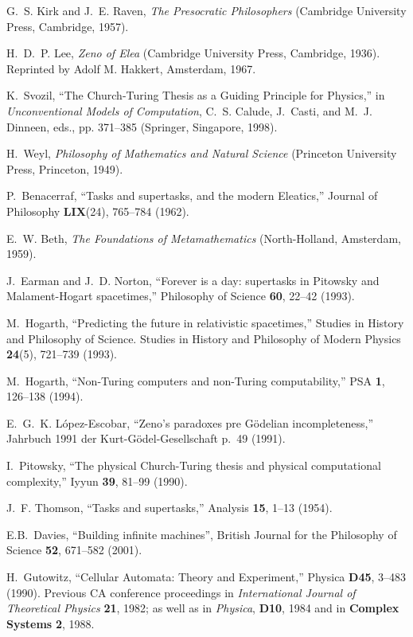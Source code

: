 \documentclass[pre,amssymb,showpacs,showkeys,preprint]{revtex4}
\begin{document}
\begin{thebibliography}{10}
G.~S. Kirk and J.~E. Raven, \emph{The Presocratic Philosophers} (Cambridge
  University Press, Cambridge, 1957).

H.~D.~P. Lee, \emph{Zeno of Elea} (Cambridge University Press, Cambridge,
  1936). Reprinted by Adolf M. Hakkert, Amsterdam, 1967.

K.~Svozil, \enquote{The {C}hurch-{T}uring Thesis as a Guiding Principle for
  Physics,} in \emph{Unconventional Models of Computation}, C.~S. Calude,
  J.~Casti, and M.~J. Dinneen, eds., pp. 371--385 (Springer, Singapore, 1998).

H.~Weyl, \emph{Philosophy of Mathematics and Natural Science} (Princeton
  University Press, Princeton, 1949).

P.~Benacerraf, \enquote{Tasks and supertasks, and the modern {E}leatics,}
  Journal of Philosophy \textbf{LIX}(24), 765--784 (1962).

E.~W. Beth, \emph{The Foundations of Metamathematics} (North-Holland,
  Amsterdam, 1959).

J.~Earman and J.~D. Norton, \enquote{Forever is a day: supertasks in {P}itowsky
  and {M}alament-{H}ogart spacetimes,} Philosophy of Science \textbf{60},
  22--42 (1993).

M.~Hogarth, \enquote{Predicting the future in relativistic spacetimes,} Studies
  in History and Philosophy of Science. Studies in History and Philosophy of
  Modern Physics \textbf{24}(5), 721--739 (1993).

M.~Hogarth, \enquote{Non-{T}uring computers and non-{T}uring computability,}
  PSA \textbf{1}, 126--138 (1994).

E.~G.~K. L{\'{o}}pez-Escobar, \enquote{{Z}eno's paradoxes pre {G}{\"{o}}delian
  incompleteness,} Jahrbuch 1991 der Kurt-G{\"{o}}del-Gesellschaft p.~49
  (1991).

I.~Pitowsky, \enquote{The physical {C}hurch-{T}uring thesis and physical
  computational complexity,} Iyyun \textbf{39}, 81--99 (1990).

J.~F. Thomson, \enquote{Tasks and supertasks,} Analysis \textbf{15}, 1--13
  (1954).

E.B.~Davies, \enquote{Building infinite machines}, British Journal for the Philosophy of Science
\textbf{52}, 671--582 (2001).

H.~Gutowitz, \enquote{Cellular Automata: Theory and Experiment,} Physica
  \textbf{D45}, 3--483 (1990). Previous CA conference proceedings in {\em
  International Journal of Theoretical Physics} {\bf 21}, 1982; as well as in
  {\em Physica}, {\bf D10}, 1984 and in {\bf Complex Systems} {\bf 2}, 1988.


\end{thebibliography}
\end{document}
